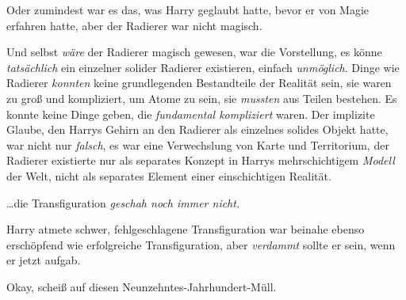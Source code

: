 Oder zumindest war es das, was Harry geglaubt hatte, bevor er von Magie erfahren hatte, aber der Radierer war nicht magisch.

Und selbst \emph{wäre} der Radierer magisch gewesen, war die Vorstellung, es könne \emph{tatsächlich} ein einzelner solider Radierer existieren, einfach \emph{unmöglich}. Dinge wie Radierer \emph{konnten} keine grundlegenden Bestandteile der Realität sein, sie waren zu groß und kompliziert, um Atome zu sein, sie \emph{mussten} aus Teilen bestehen. Es konnte keine Dinge geben, die \emph{fundamental kompliziert} waren. Der implizite Glaube, den Harrys Gehirn an den Radierer als einzelnes solides Objekt hatte, war nicht nur \emph{falsch}, es war eine Verwechslung von Karte und Territorium, der Radierer existierte nur als separates Konzept in Harrys mehrschichtigem \emph{Modell} der Welt, nicht als separates Element einer einschichtigen Realität.

…die Transfiguration \emph{geschah noch immer nicht.}

Harry atmete schwer, fehlgeschlagene Transfiguration war beinahe ebenso erschöpfend wie erfolgreiche Transfiguration, aber \emph{verdammt} sollte er sein, wenn er jetzt aufgab.

Okay, scheiß auf diesen Neunzehntes-Jahrhundert-Müll.

